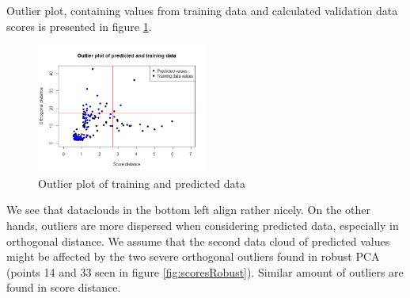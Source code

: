 \documentclass[12pt]{article}
\begin{document}
Outlier plot, containing values from training data and calculated validation data scores is presented in figure \ref{fig:outlierPred}.
\begin{figure}[h!]
  \begin{center}
    \centering
    \includegraphics[width=0.5\textwidth]{../images/project1/outlierPred.png}
    \caption{Outlier plot of training and predicted data}
    \label{fig:outlierPred}
  \end{center}
\end{figure}

We see that dataclouds in the bottom left align rather nicely. On the other hands, outliers are more dispersed when 
considering predicted data, especially in orthogonal distance. We assume that the second data cloud of predicted values might 
be affected by the two severe orthogonal outliers found in robust PCA (points 14 and 33 seen in figure \ref{fig:scoresRobust}). 
Similar amount of outliers are found in score distance.
\end{document}
